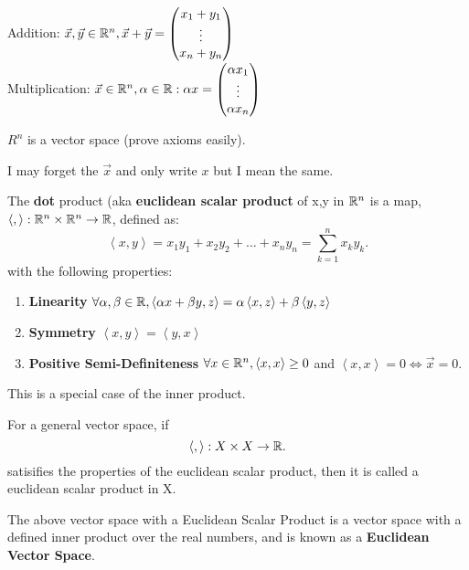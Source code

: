 \documentclass[a4paper]{article}
\begin{document}
Addition: $\vec{x}, \vec{y} \in \mathbb{R}^n, \vec{x} + \vec{y} = \begin{pmatrix} x_1 + y_1 \\ \vdots\\ x_n + y_n \end{pmatrix}$ \\
Multiplication: $\vec{x} \in \mathbb{R}^n, \alpha \in \mathbb{R}: \alpha x = \begin{pmatrix} \alpha x_1\\ \vdots\\ \alpha x_n \end{pmatrix}$

$R^{n}$ is a vector space (prove axioms easily).

\begin{remark}
  I may forget the $\vec{x}$ and only write $x$ but I mean the same.
\end{remark}

\begin{definition}
  The \textbf{dot} product (aka \textbf{euclidean scalar product} of x,y in $\mathbb{R}^n$ is a map, $\left< , \right>: \mathbb{R}^n \times \mathbb{R}^n \to \mathbb{R}$, defined as:
  \[
    \left< x,y \right> = x_1 y_1 + x_2 y_2 + \ldots + x_n y_n = \sum_{k=1}^n x_k y_k 
  .\] with the following properties:
  \begin{enumerate}
    \item \textbf{Linearity} $\forall \alpha, \beta \in \mathbb{R}, \left< \alpha x + \beta y, z \right> = \alpha \left< x,z \right> + \beta \left< y,z \right>$ 
    \item \textbf{Symmetry} $\left< x,y  \right> = \left< y ,x \right>$
    \item \textbf{Positive Semi-Definiteness} $\forall x \in \mathbb{R}^{n}, \left< x,x \right> \geq 0$ and $\left<x,x \right> = 0 \iff \vec{x} = 0$.
  \end{enumerate}

\end{definition}

\begin{remark}
  This is a special case of the inner product. 
\end{remark}

\begin{definition}
  For a general vector space, if 
  \[
  \left< , \right>: X \times X \to \mathbb{R}
  .\] 
  satisifies the properties of the euclidean scalar product, then it is called a euclidean scalar product in X.
\end{definition}

\begin{definition}
  The above vector space with a Euclidean Scalar Product is a vector space with a defined inner product over the real numbers,
  and is known as a \textbf{Euclidean Vector Space}.
\end{definition}
\end{document}
